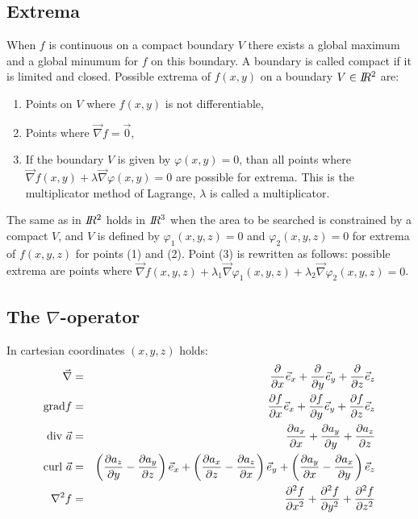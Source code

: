 \documentclass[a4paper,fancyheadings,twoside]{report}
\begin{document}
\subsection{Extrema}
When $f$ is continuous on a compact boundary $V$ there exists a global
maximum and a global minumum for $f$ on this boundary. A boundary is called
compact if it is limited and closed.
\npar
Possible extrema of $f(x,y)$ on a boundary $V\in I\hspace{-1mm}R^2$ are:
\begin{enumerate}
\item Points on $V$ where $f(x,y)$ is not differentiable,
\item Points where $\vec{\nabla}f=\vec{0}$,
\item If the boundary $V$ is given by $\varphi(x,y)=0$, than all points where
      $\vec{\nabla}f(x,y)+\lambda\vec{\nabla}\varphi(x,y)=0$ are possible
      for extrema. This is the multiplicator method of Lagrange, $\lambda$
      is called a multiplicator.
\end{enumerate}
The same as in $I\hspace{-1mm}R^2$ holds in $I\hspace{-1mm}R^3$ when the area to be searched is
constrained by a compact $V$, and $V$ is defined by $\varphi_1(x,y,z)=0$ and
$\varphi_2(x,y,z)=0$ for extrema of $f(x,y,z)$ for points (1) and (2).
Point (3) is rewritten as follows: possible extrema are points where
$\vec{\nabla}f(x,y,z)+\lambda_1\vec{\nabla}\varphi_1(x,y,z)+\lambda_2\vec{\nabla}\varphi_2(x,y,z)=0$.

\subsection{The $\nabla$-operator}
In cartesian coordinates $(x,y,z)$ holds:
\begin{eqnarray*}
\vec{\nabla}     &=&\frac{\partial }{\partial x}\vec{e}_{x}+\frac{\partial }{\partial y}\vec{e}_{y}+\frac{\partial }{\partial z}\vec{e}_{z}\\
{\rm grad}f      &=&\frac{\partial f}{\partial x}\vec{e}_{x}+\frac{\partial f}{\partial y}\vec{e}_{y}+\frac{\partial f}{\partial z}\vec{e}_{z}\\
{\rm div}~\vec{a}&=&\frac{\partial a_x}{\partial x}+\frac{\partial a_y}{\partial y}+\frac{\partial a_z}{\partial z}\\
{\rm curl}~\vec{a}&=&\left(\frac{\partial a_z}{\partial y}-\frac{\partial a_y}{\partial z}\right)\vec{e}_{x}+
                    \left(\frac{\partial a_x}{\partial z}-\frac{\partial a_z}{\partial x}\right)\vec{e}_{y}+
                    \left(\frac{\partial a_y}{\partial x}-\frac{\partial a_x}{\partial y}\right)\vec{e}_{z}\\
\nabla^2 f       &=&\frac{\partial^2 f}{\partial x^2}+\frac{\partial^2 f}{\partial y^2}+\frac{\partial^2 f}{\partial z^2}
\end{eqnarray*}
\end{document}
